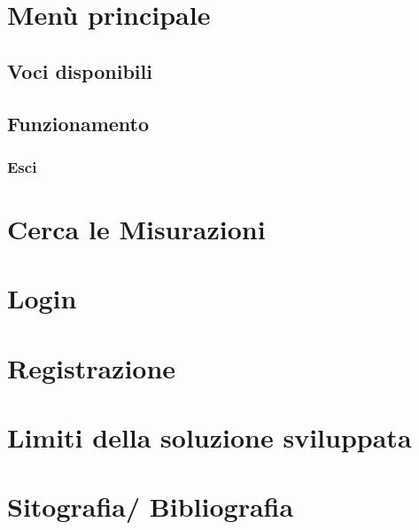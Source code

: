 \documentclass[a4paper, 12pt,twoside]{article}
\begin{document}
	\section{Menù principale}
	\subsection{Voci disponibili}
	\subsection{Funzionamento}
			\subsubsection{Esci}
	
	\section{Cerca le Misurazioni}
	\section{Login}
	\section{Registrazione}

	\section{Limiti della soluzione sviluppata}
	\section{Sitografia/ Bibliografia}
	

		
	
	

	

	

	
	
	
	
	
\end{document}
